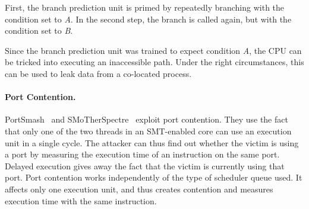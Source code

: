 \documentclass[11pt,
  titlepage=false,
  parskip=half,      %
]{scrreprt}
\begin{document}
First, the branch prediction unit is primed by repeatedly branching with the condition set to \textit{A}.
In the second step, the branch is called again, but with the condition set to \textit{B}.

Since the branch prediction unit was trained to expect condition \textit{A},
the CPU can be tricked into executing an inaccessible path.
Under the right circumstances, this can be used to leak data from a co-located process.

\paragraph{Port Contention.}
PortSmash~\cite{Aldaya2019port} and SMoTherSpectre~\cite{Bhattacharyya2019} exploit port contention.
They use the fact that only one of the two threads in an SMT-enabled core can use an execution unit in a single cycle.
The attacker can thus find out whether the victim is using a port by measuring the execution time of an instruction on the same port.
Delayed execution gives away the fact that the victim is currently using that port.
Port contention works independently of the type of scheduler queue used.
It affects only one execution unit, and thus creates contention and measures execution time with the same instruction.
\end{document}
